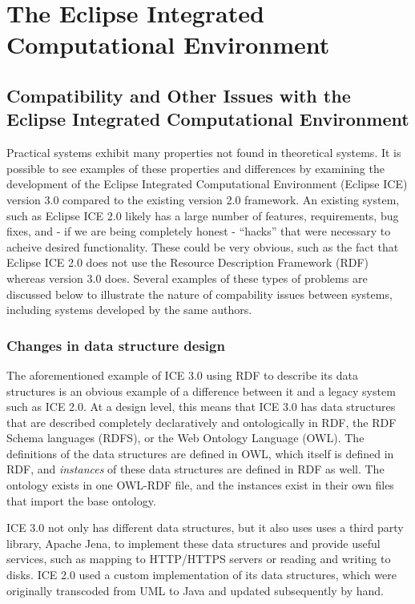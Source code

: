 \chapter{The Eclipse Integrated Computational Environment} \label{ch:eclipse-ice}


\section{Compatibility and Other Issues with the Eclipse Integrated Computational Environment}

Practical systems exhibit many properties not found in theoretical systems. It is possible to see examples of these properties and differences by examining the development of the Eclipse Integrated Computational Environment (Eclipse ICE) version 3.0 compared to the existing version 2.0 framework. An existing system, such as Eclipse ICE 2.0 likely has a large number of features, requirements, bug fixes, and - if we are being completely honest - ``hacks'' that were necessary to acheive desired functionality. These could be very obvious, such as the fact that Eclipse ICE 2.0 does not use the Resource Description Framework (RDF) whereas version 3.0 does. Several examples of these types of problems are discussed below to illustrate the nature of compability issues between systems, including systems developed by the same authors.

\subsection{Changes in data structure design}

The aforementioned example of ICE 3.0 using RDF to describe its data structures is an obvious example of a difference between it and a legacy system such as ICE 2.0. At a design level, this means that ICE 3.0 has data structures that are described completely declaratively and ontologically in RDF, the RDF Schema languages (RDFS), or the Web Ontology Language (OWL). The definitions of the data structures are defined in OWL, which itself is defined in RDF, and \textit{instances} of these data structures are defined in RDF as well. The ontology exists in one OWL-RDF file, and the instances exist in their own files that import the base ontology. 

ICE 3.0 not only has different data structures, but it also uses uses a third party library, Apache Jena, to implement these data structures and provide useful services, such as mapping to HTTP/HTTPS servers or reading and writing to disks. ICE 2.0 used a custom implementation of its data structures, which were originally transcoded from UML to Java and updated subsequently by hand. 

